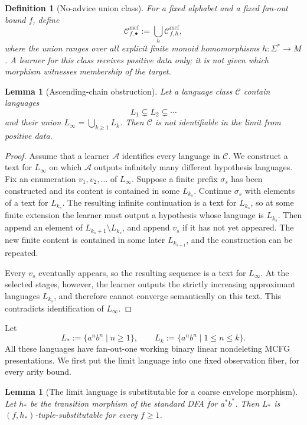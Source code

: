 \documentclass[11pt,a4paper]{article}
\newtheorem{lemma}[theorem]{Lemma}
\newtheorem{definition}[theorem]{Definition}
\theoremstyle{remark}
\newcommand{\Cmcf}[2]{\mathcal{C}^{\mathrm{mcf}}_{#1,#2}}
\begin{document}
\begin{definition}[No-advice union class]
\label{def:no-advice-union}
For a fixed alphabet and a fixed fan-out bound \(f\), define
\[
  \Cmcf{f}{\bullet}:=\bigcup_h \Cmcf{f}{h},
\]
where the union ranges over all explicit finite monoid homomorphisms
\(h\colon\Sigma^*\to M\).  A learner for this class receives positive data only;
it is not given which morphism witnesses membership of the target.
\end{definition}

\begin{lemma}[Ascending-chain obstruction]
\label{lem:ascending-chain-obstruction}
Let a language class \(\mathcal C\) contain languages
\[
  L_1\subsetneq L_2\subsetneq\cdots
\]
and their union \(L_\infty=\bigcup_{k\ge1}L_k\).  Then \(\mathcal C\) is not
identifiable in the limit from positive data.
\end{lemma}

\begin{proof}
Assume that a learner \(\mathcal A\) identifies every language in
\(\mathcal C\).  We construct a text for \(L_\infty\) on which
\(\mathcal A\) outputs infinitely many different hypothesis languages.
Fix an enumeration \(v_1,v_2,\ldots\) of \(L_\infty\).  Suppose a finite prefix
\(\sigma_s\) has been constructed and its content is contained in some
\(L_{k_s}\).  Continue \(\sigma_s\) with elements of a text for \(L_{k_s}\).
The resulting infinite continuation is a text for \(L_{k_s}\), so at some
finite extension the learner must output a hypothesis whose language is
\(L_{k_s}\).  Then append an element of
\(L_{k_s+1}\setminus L_{k_s}\), and append \(v_s\) if it has not yet appeared.
The new finite content is contained in some later \(L_{k_{s+1}}\), and the
construction can be repeated.

Every \(v_s\) eventually appears, so the resulting sequence is a text for
\(L_\infty\).  At the selected stages, however, the learner outputs the
strictly increasing approximant languages \(L_{k_s}\), and therefore cannot
converge semantically on this text.  This contradicts identification of
\(L_\infty\).
\end{proof}

Let
\[
  L_*:=\{a^n b^n\mid n\ge1\},
  \qquad
  L_k:=\{a^n b^n\mid 1\le n\le k\}.
\]
All these languages have fan-out-one working binary linear nondeleting MCFG
presentations.  We first put the limit language into one fixed observation
fiber, for every arity bound.

\begin{lemma}[The limit language is substitutable for a coarse envelope morphism]
\label{lem:limit-ab-substitutable}
Let \(h_*\) be the transition morphism of the standard DFA for \(a^*b^*\).  Then
\(L_*\) is \((f,h_*)\)-tuple-substitutable for every \(f\ge1\).
\end{lemma}
\end{document}

